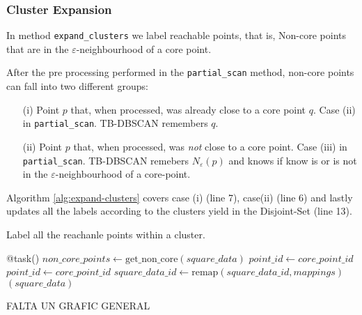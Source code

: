 \documentclass[10pt,journal,compsoc]{IEEEtran}
\let\MYoriglatexcaption\caption
\renewcommand{\caption}[2][\relax]{\MYoriglatexcaption[#2]{#2}}
\begin{document}
\subsubsection{Cluster Expansion} \label{cluster_exp}
In method \texttt{expand\_clusters} we label reachable points, that is, Non-core points that are in the $\varepsilon$-neighbourhood of a core point.

After the pre processing performed in the \texttt{partial\_scan} method, non-core points can fall into two different groups:
\begin{itemize}
    \item[(i)] Point $p$ that, when processed, was already close to a core point $q$. Case (ii) in \texttt{partial\_scan}. TB-DBSCAN remembers $q$.
    \item[(ii)] Point $p$ that, when processed, was \emph{not} close to a core point. Case (iii) in \texttt{partial\_scan}. TB-DBSCAN remebers $N_{\varepsilon}(p)$ and knows if know is or is not in the $\varepsilon$-neighbourhood of a core-point.
\end{itemize}

Algorithm \ref{alg:expand-clusters} covers case (i) (line 7), case(ii) (line 6) and lastly updates all the labels according to the clusters yield in the Disjoint-Set (line 13).

\begin{algorithm}
  \caption{Label all the reachanle points within a cluster. \label{alg:expand-clusters}}
  \begin{algorithmic}[1]
    \State @task()
        \State {}
        \State $non\_core\_points \gets \text{get\_non\_core}(square\_data)$
                \State $point\_id \gets core\_point\_id$
                \State $point\_id \gets core\_point\_id$
            \EndIf
        \EndFor
        \State {}
        \State $square\_data\_id \gets \text{remap}(square\_data\_id, mappings)$
        \State {}$(square\_data)$
    \EndFunction
  \end{algorithmic}
\end{algorithm}

FALTA UN GRAFIC GENERAL

\end{document}
